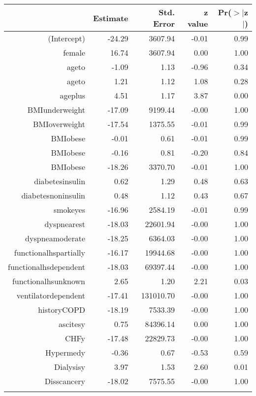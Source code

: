 \bigskip\bigskip
\centering
\begin{tabular}{rrrrr}
  \hline
 & Estimate & Std. Error & z value & Pr($>$$|$z$|$) \\ 
  \hline
(Intercept) & -24.29 & 3607.94 & -0.01 & 0.99 \\ 
  female & 16.74 & 3607.94 & 0.00 & 1.00 \\ 
  age\-65\-to\-74 & -1.09 & 1.13 & -0.96 & 0.34 \\ 
  age\-75\-to\-84 & 1.21 & 1.12 & 1.08 & 0.28 \\ 
  age\-85\-plus & 4.51 & 1.17 & 3.87 & 0.00 \\ 
  BMI\-underweight & -17.09 & 9199.44 & -0.00 & 1.00 \\ 
  BMI\-overweight & -17.54 & 1375.55 & -0.01 & 0.99 \\ 
  BMI\-obese\-1 & -0.01 & 0.61 & -0.01 & 0.99 \\ 
  BMI\-obese\-2 & -0.16 & 0.81 & -0.20 & 0.84 \\ 
  BMI\-obese\-3 & -18.26 & 3370.70 & -0.01 & 1.00 \\ 
  diabetes\-insulin & 0.62 & 1.29 & 0.48 & 0.63 \\ 
  diabetes\-noninsulin & 0.48 & 1.12 & 0.43 & 0.67 \\ 
  smoke\-yes & -16.96 & 2584.19 & -0.01 & 0.99 \\ 
  dyspnea\-rest & -18.03 & 22601.94 & -0.00 & 1.00 \\ 
  dyspnea\-moderate & -18.25 & 6364.03 & -0.00 & 1.00 \\ 
  functional\-hs\-partially & -16.17 & 19944.68 & -0.00 & 1.00 \\ 
  functional\-hs\-dependent & -18.03 & 69397.44 & -0.00 & 1.00 \\ 
  functional\-hs\-unknown & 2.65 & 1.20 & 2.21 & 0.03 \\ 
  ventilator\-dependent & -17.41 & 131010.70 & -0.00 & 1.00 \\ 
  history\-COPD & -18.19 & 7533.39 & -0.00 & 1.00 \\ 
  ascites\-y & 0.75 & 84396.14 & 0.00 & 1.00 \\ 
  CHF\-y & -17.48 & 22829.73 & -0.00 & 1.00 \\ 
  Hyper\-med\-y & -0.36 & 0.67 & -0.53 & 0.59 \\ 
  Dialysis\-y & 3.97 & 1.53 & 2.60 & 0.01 \\ 
  Diss\-cancer\-y & -18.02 & 7575.55 & -0.00 & 1.00 \\ 
$$
\end{tabular}
